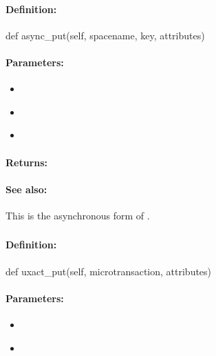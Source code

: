 \paragraph{Definition:}
\begin{pythoncode}
def async_put(self, spacename, key, attributes)
\end{pythoncode}

\paragraph{Parameters:}
\begin{itemize}[noitemsep]
\item {}\\

\item {}\\

\item {}\\

\end{itemize}

\paragraph{Returns:}


\paragraph{See also:}  This is the asynchronous form of .

\pagebreak
\subsubsection{}
\label{api:python:uxact_put}


\paragraph{Definition:}
\begin{pythoncode}
def uxact_put(self, microtransaction, attributes)
\end{pythoncode}

\paragraph{Parameters:}
\begin{itemize}[noitemsep]
\item {}\\

\item {}\\

\end{itemize}

